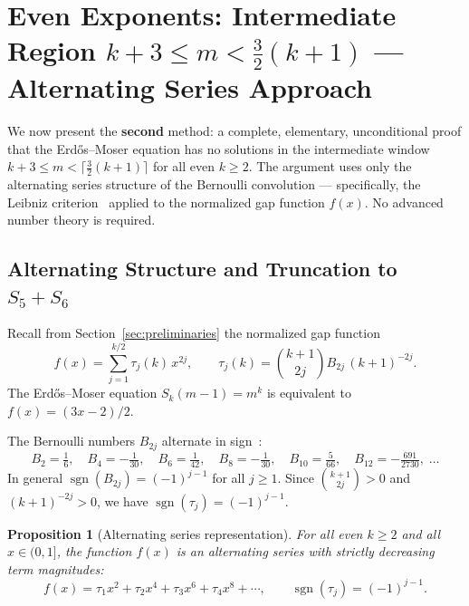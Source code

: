 \documentclass[12pt,a4paper]{article}
\theoremstyle{plain}
\newtheorem{proposition}[theorem]{Proposition}
\theoremstyle{definition}
\begin{document}
\section{Even Exponents: Intermediate Region $k+3 \le m < \frac{3}{2}(k+1)$ --- Alternating Series Approach}
\label{sec:alternating-series}

We now present the \textbf{second} method: a complete,
elementary, unconditional proof that the Erd\H{o}s--Moser equation has no
solutions in the intermediate window
$k+3 \le m < \lceil\frac{3}{2}(k+1)\rceil$ for all even $k \ge 2$.
The argument uses only the alternating series structure of the Bernoulli
convolution --- specifically, the Leibniz criterion~\cite{Leibniz} applied
to the normalized gap function $f(x)$.  No advanced number theory is required.

\subsection{Alternating Structure and Truncation to $S_5+S_6$}
\label{sec:alt-structure}

Recall from Section~\ref{sec:preliminaries} the normalized gap function
\[
  f(x) = \sum_{j=1}^{k/2} \tau_j(k) \, x^{2j},
  \qquad
  \tau_j(k) = \binom{k+1}{2j} B_{2j} \, (k+1)^{-2j}.
\]
The Erd\H{o}s--Moser equation $S_k(m-1) = m^k$ is equivalent to
$f(x) = (3x-2)/2$.

The Bernoulli numbers $B_{2j}$ alternate in sign~\cite{Bernoulli,Euler}:
\[
  B_2 = \tfrac{1}{6},\quad
  B_4 = -\tfrac{1}{30},\quad
  B_6 = \tfrac{1}{42},\quad
  B_8 = -\tfrac{1}{30},\quad
  B_{10} = \tfrac{5}{66},\quad
  B_{12} = -\tfrac{691}{2730},\;\dots
\]
In general $\operatorname{sgn}(B_{2j}) = (-1)^{j-1}$ for all $j \ge 1$.
Since $\binom{k+1}{2j} > 0$ and $(k+1)^{-2j} > 0$, we have
$\operatorname{sgn}(\tau_j) = (-1)^{j-1}$.

\begin{proposition}[Alternating series representation]\label{prop:alternating}
  For all even $k \ge 2$ and all $x \in (0,1]$, the function $f(x)$ is
  an alternating series with strictly decreasing term magnitudes:
  \[
    f(x) = \tau_1 x^2 + \tau_2 x^4 + \tau_3 x^6 + \tau_4 x^8 + \cdots,
    \qquad \operatorname{sgn}(\tau_j) = (-1)^{j-1}.
  \]
\end{proposition}
\end{document}
